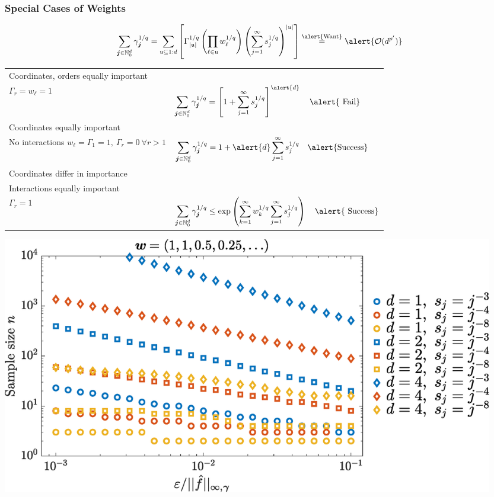 \documentclass[11pt,compress,xcolor={usenames,dvipsnames},aspectratio=169]{beamer}
\begin{document}
\begin{frame}
\frametitle{Special Cases of Weights}
\vspace{-6ex}
\begin{equation*}
\sum_{\vj \in \natzero^d} \gamma_{\vj}^{1/q} = \sum_{\fu \subseteq 1:d} \left[ \Gamma_{\abs{\fu}}^{1/q}  \left(\prod_{\ell \in \fu} w_{\ell}^{1/q} \right) \left(\sum_{j=1}^{\infty} s_{j}^{1/q} \right)^{\abs{\fu}} \right] \overset{\alert{\text{Want}}}{=} \alert{\Order(d^{p'})}
\end{equation*}
\vspace{-1ex}
\begin{tabular}{>{\raggedleft}m{}>{\flushleft}m{}}
\hfill \hfill Coordinates, orders equally important \\ 
$\Gamma_r = w_\ell = 1$
& 
$ \displaystyle
\sum_{\vj \in \natzero^d} \gamma_{\vj}^{1/q} 
= \left[1 +\sum_{j = 1}^{\infty} s_{j}^{1/q}\right]^{\alert{d}}
 \quad \alert{\text{ Fail}}
$
\tabularnewline
 Coordinates equally important\\
\hfill No interactions\newline
$w_\ell =\Gamma_1 = 1, \ \Gamma_r = 0 \ \forall r > 1$ 
&
$
\displaystyle
\sum_{\vj \in \natzero^d} \gamma_{\vj}^{1/q} 
= 1 + \alert{d} \sum_{j = 1}^{\infty} s_{j}^{1/q} \quad \alert{\text{Success}}
$
\tabularnewline
\hfill Coordinates differ in importance \\
\hfill \hfill Interactions equally important\\
$\Gamma_r = 1$
&
$
\displaystyle
\sum_{\vj \in \natzero^d} \gamma_{\vj}^{1/q} 
\le \exp\left(\sum_{k=1}^\infty w_k^{1/q} \sum_{j=1}^\infty s_j^{1/q} \right) \quad \alert{\text{ Success}} 
$
\end{tabular}

\end{frame}

\begin{frame}
\centerline{\includegraphics[width=0.95\textwidth]{FourierSampling/SampleSizeForDifferGamma.eps}}
\end{frame}
\end{document}
